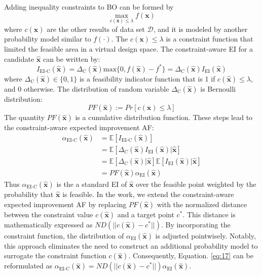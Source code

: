 \documentclass[preprint,review,12pt,authoryear]{elsarticle}
\begin{document}
Adding inequality constraints to BO can be formed by
\begin{equation}
\max_{c(\boldsymbol{x}) \leq \lambda} f(\boldsymbol{x})
\label{eq:11}
\end{equation}
where $c(\boldsymbol{x})$ are the other results of data set $\mathcal{D}$, and it is modeled by another probability model similar to $f(\cdot)$. The $c(\boldsymbol{x})\leq \lambda$ is a constraint function that limited the feasible area in a virtual design space. The constraint-aware EI for a candidate $\hat{\boldsymbol{x}}$ can be written by:
\begin{equation}
I_{\text{EI-C}}(\hat{\boldsymbol{x}})=\Delta_\text{C}(\hat{\boldsymbol{x}})\text{max}\{0, f(\hat{\boldsymbol{x}})-f^*\}=\Delta_\text{C}(\hat{\boldsymbol{x}})I_{\text{EI}}(\hat{\boldsymbol{x}})
    \label{eq:12}
\end{equation}
where $\Delta_\text{C}(\hat{\boldsymbol{x}})\in \{0,1\}$ is a feasibility indicator function that is 1 if $c(\hat{\boldsymbol{x}})\leq \lambda$, and 0 otherwise. 
The distribution of random variable $\Delta_\text{C}(\hat{\boldsymbol{x}})$ is Bernoulli distribution:
\begin{equation}
    PF(\hat{\boldsymbol{x}}):=Pr[c(\boldsymbol{x})\leq \lambda] 
    \label{eq:13}
\end{equation}
The quantity $PF(\hat{\boldsymbol{x}})$ is a cumulative distribution function. These steps lead to the  constraint-aware expected improvement AF:
\begin{equation}
\begin{aligned}
\alpha_{\text{EI-C}}(\hat{\boldsymbol{x}}) &=\mathbb{E}[I_\text{EI-C}(\hat{\boldsymbol{x}})]\\
&= \mathbb{E}[\Delta_{C}(\hat{\boldsymbol{x}})I_{\text{EI}}(\hat{\boldsymbol{x}})|\hat{\boldsymbol{x}}]\\
&= \mathbb{E}[\Delta_{C}(\hat{\boldsymbol{x}})|\hat{\boldsymbol{x}}]\mathbb{E}[I_\text{EI}(\hat{\boldsymbol{x}})|\hat{\boldsymbol{x}}]\\
&=PF(\hat{\boldsymbol{x}})\alpha_{\text{EI}}(\hat{\boldsymbol{x}})
\end{aligned}
\label{eq:14}
\end{equation}
Thus $\alpha_{\text{EI-C}}(\hat{\boldsymbol{x}})$ is the a standard EI of $\hat{\boldsymbol{x}}$ over the feasible point weighted by the probability that $\hat{\boldsymbol{x}}$ is feasible. In the work, we extend the constraint-aware expected improvement AF by replacing $PF(\hat{\boldsymbol{x}})$ with the normalized distance between the constraint value $c(\hat{\boldsymbol{x}})$ and a target point $c^*$. This distance is mathematically expressed as $ND(||c(\hat{\boldsymbol{x}})-c^*||)$. By incorporating the constraint function, the distribution of \(\alpha_{\text{EI}}(\hat{\boldsymbol{x}})\) is adjusted pointwisely. Notably, this approach eliminates the need to construct an additional probability model to surrogate the constraint function $c(\hat{\boldsymbol{x}}) $. Consequently, Equation. \ref{eq:17} can be reformulated as $\alpha_{\text{EI-C}}(\hat{\boldsymbol{x}}) =ND(||c(\hat{\boldsymbol{x}})-c^*||)\alpha_{\text{EI}}(\hat{\boldsymbol{x}})
$. 
\end{document}
